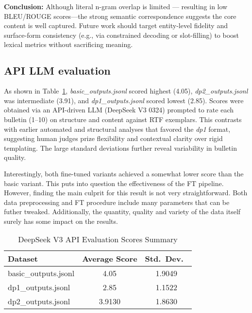\noindent
\textbf{Conclusion:}
Although literal n-gram overlap is limited — resulting in low BLEU/ROUGE scores—the strong semantic correspondence suggests the core content is well captured. Future work should target entity-level fidelity and surface-form consistency (e.g., via constrained decoding or slot-filling) to boost lexical metrics without sacrificing meaning.


\subsection*{API LLM evaluation}

As shown in Table~\ref{tab:evaluation-summary}, \emph{basic\_outputs.jsonl} scored highest (4.05), \emph{dp2\_outputs.jsonl} was intermediate (3.91), and \emph{dp1\_outputs.jsonl} scored lowest (2.85). Scores were obtained via an API-driven LLM (DeepSeek V3 0324) prompted to rate each bulletin (1--10) on structure and content against RTF exemplars. This contrasts with earlier automated and structural analyses that favored the \emph{dp1} format, suggesting human judges prize flexibility and contextual clarity over rigid templating. The large standard deviations further reveal variability in bulletin quality.

Interestingly, both fine-tuned variants achieved a somewhat lower score than the basic variant.
This puts into question the effectiveness of the FT pipeline.
However, finding the main culprit for this result is not very straightforward.
Both data preprocessing and FT procedure include many parameters that can be futher tweaked.
Additionally, the quantity, quality and variety of the data itself surely has some impact on the results.

\begin{table}[ht]
  \centering
  \caption{DeepSeek V3 API Evaluation Scores Summary}
  \label{tab:evaluation-summary}
  \begin{tabular}{lcc}
    \toprule
    Dataset               & Average Score & Std.\ Dev.\ \\
    \midrule
    basic\_outputs.jsonl  & 4.05          & 1.9049      \\
    dp1\_outputs.jsonl    & 2.85          & 1.1522      \\
    dp2\_outputs.jsonl    & 3.9130        & 1.8630      \\
    \bottomrule
  \end{tabular}
\end{table}


